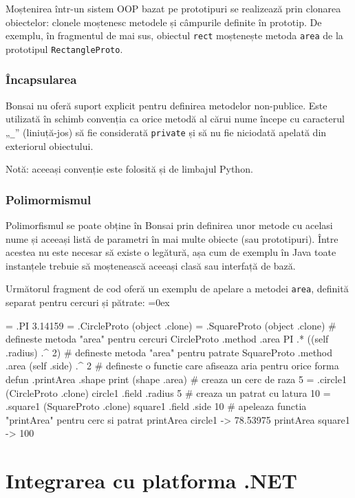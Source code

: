 \documentclass[12pt,a4paper]{memoir}
\renewcommand{\c}{\texttt}
\newenvironment{code}
{
\definecolor{shadecolor}{gray}{0.91}
\topsep=0ex
\relax
\shaded
\verbatim
}
{
\endverbatim
\endshaded
}
\begin{document}
Moștenirea într-un sistem OOP bazat pe prototipuri se realizează prin clonarea obiectelor: clonele moștenesc metodele și câmpurile definite în prototip. De exemplu, în fragmentul de mai sus, obiectul \c{rect} moștenește metoda \c{area} de la prototipul \c{RectangleProto}.

\subsection{Încapsularea}

Bonsai nu oferă suport explicit pentru definirea metodelor non-publice. Este utilizată în schimb convenția ca orice metodă al cărui nume începe cu caracterul „\c{\_}” (liniuță-jos) să fie considerată \c{private} și să nu fie niciodată apelată din exteriorul obiectului.

Notă: aceeași convenție este folosită și de limbajul Python\cite{python_classes}.

\subsection{Polimormismul}

Polimorfismul se poate obține în Bonsai prin definirea unor metode cu acelasi nume și aceeași listă de parametri în mai multe obiecte (sau prototipuri). Între acestea nu este necesar să existe o legătură, așa cum de exemplu în Java toate instanțele trebuie să moștenească aceeași clasă sau interfață de bază.

Următorul fragment de cod oferă un exemplu de apelare a metodei \c{area}, definită separat pentru cercuri și pătrate:
\begin{code}
= .PI 3.14159
= .CircleProto (object .clone)
= .SquareProto (object .clone)
# defineste metoda "area" pentru cercuri
CircleProto .method .area {
  PI .* ((self .radius) .^ 2)
}
# defineste metoda "area" pentru patrate
SquareProto .method .area { 
  (self .side) .^ 2 
}
# defineste o functie care afiseaza aria pentru orice forma
defun .printArea .shape { 
  print (shape .area)
}
# creaza un cerc de raza 5
= .circle1 (CircleProto .clone)
circle1 .field .radius 5
# creaza un patrat cu latura 10
= .square1 (SquareProto .clone)
square1 .field .side 10
# apeleaza functia "printArea" pentru cerc si patrat
printArea circle1
  -> 78.53975
printArea square1
  -> 100
\end{code}

\chapter{Integrarea cu platforma .NET}\label{ch:IntegratingWithDotNet}
\end{document}
